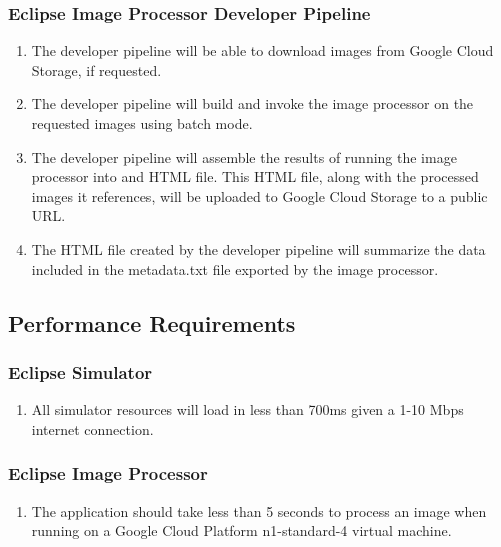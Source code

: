 \documentclass[10pt, onecolumn, draftclsnofoot, letterpaper, compsoc]{IEEEtran}
\begin{document}
\subsubsection{Eclipse Image Processor Developer Pipeline}
	\begin{enumerate}
		\item The developer pipeline will be able to download images from Google Cloud Storage, if requested.

        \item The developer pipeline will build and invoke the image processor on the requested images
        using batch mode.

        \item The developer pipeline will assemble the results of running the image processor into
        and HTML file. This HTML file, along with the processed images it references,
        will be uploaded to Google Cloud Storage to a public URL.

        \item The HTML file created by the developer pipeline will summarize the data included
        in the metadata.txt file exported by the image processor.

	\end{enumerate}

\subsection{Performance Requirements}

\subsubsection{Eclipse Simulator}
	\begin{enumerate}
		\item All simulator resources will load in less than 700ms given a 1-10
		 Mbps internet connection.
	\end{enumerate}

\subsubsection{Eclipse Image Processor}
	\begin{enumerate}
		\item The application should take less than 5 seconds to process an
		 image when running on a Google Cloud Platform n1-standard-4 virtual
		 machine.
	\end{enumerate}
\end{document}
